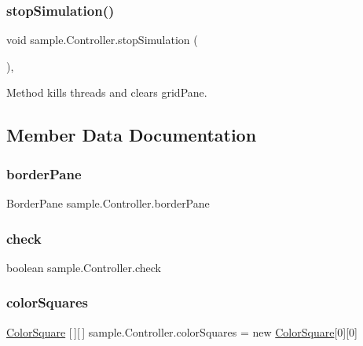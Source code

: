 \subsubsection{\texorpdfstring{stop\+Simulation()}{stopSimulation()}}
{\footnotesize\ttfamily void sample.\+Controller.\+stop\+Simulation (\begin{DoxyParamCaption}{ }\end{DoxyParamCaption})\hspace{0.3cm}{\ttfamily [inline]}, {\ttfamily [private]}}

Method kills threads and clears grid\+Pane. 

\subsection{Member Data Documentation}
\mbox{\label{classsample_1_1_controller_a90ba7075d9657608b5e9effe8b4e74c5}} 
\subsubsection{\texorpdfstring{border\+Pane}{borderPane}}
{\footnotesize\ttfamily Border\+Pane sample.\+Controller.\+border\+Pane}

\mbox{\label{classsample_1_1_controller_aea731cf67bae06ace5e32f8ca4626973}} 
\subsubsection{\texorpdfstring{check}{check}}
{\footnotesize\ttfamily boolean sample.\+Controller.\+check\hspace{0.3cm}{\ttfamily [private]}}

\mbox{\label{classsample_1_1_controller_aeb096ea8a6b56a935bcef6e3cd639047}} 
\subsubsection{\texorpdfstring{color\+Squares}{colorSquares}}
{\footnotesize\ttfamily \mbox{\hyperlink{classsample_1_1_color_square}{Color\+Square}} \mbox{[}$\,$\mbox{]}\mbox{[}$\,$\mbox{]} sample.\+Controller.\+color\+Squares = new \mbox{\hyperlink{classsample_1_1_color_square}{Color\+Square}}\mbox{[}0\mbox{]}\mbox{[}0\mbox{]}\hspace{0.3cm}{\ttfamily [private]}}

